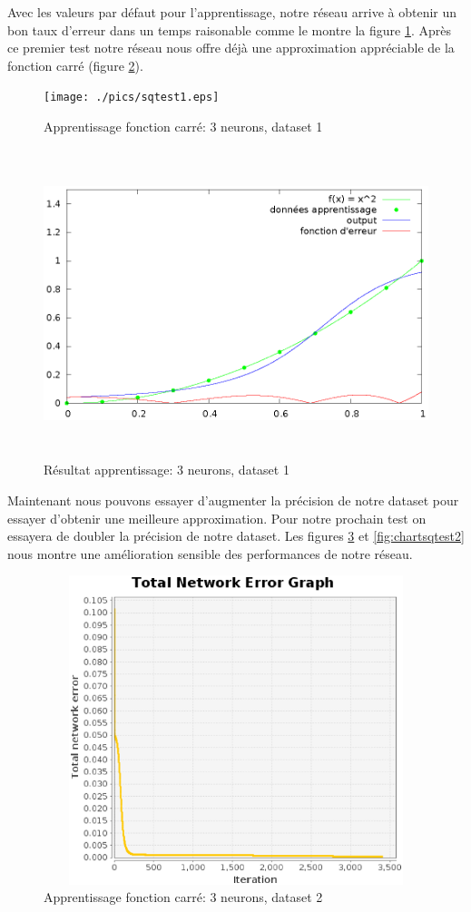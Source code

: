 \documentclass[twoside,openright,a4paper,11pt,french]{article}
\begin{document}
Avec les valeurs par défaut pour l'apprentissage, notre réseau arrive à obtenir
un bon taux d'erreur dans un temps raisonable comme le montre la figure
\ref{fig:sqtest1}. Après ce premier test notre réseau nous offre déjà une
approximation appréciable de la fonction carré (figure \ref{fig:chartsqtest1}).

\begin{figure}[h]
\centering
\texttt{[image: ./pics/sqtest1.eps]}
\caption{Apprentissage fonction carré: 3 neurons, dataset 1}
\label{fig:sqtest1}
\end{figure}

\begin{figure}[h]
\centering
\includegraphics[width=12cm,height=9cm]{./pics/chartsqtest1.eps}
\caption{Résultat apprentissage: 3 neurons, dataset 1}
\label{fig:chartsqtest1}
\end{figure}

Maintenant nous pouvons essayer d'augmenter la précision de notre dataset
pour essayer d'obtenir une meilleure approximation. Pour notre 
prochain test on essayera de doubler la précision de notre dataset.
Les figures \ref{fig:sqtest2} et \ref{fig:chartsqtest2} nous montre 
une amélioration sensible des performances de notre réseau. 



\begin{figure}[h]
\centering
\includegraphics[width=12cm,height=9cm]{./pics/sqtest2.eps}
\caption{Apprentissage fonction carré: 3 neurons, dataset 2}
\label{fig:sqtest2}
\end{figure}
\end{document}
